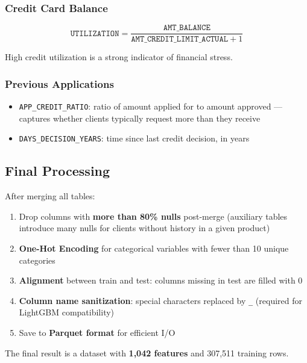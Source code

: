 \documentclass[12pt, a4paper]{article}
\begin{document}
\subsubsection{Credit Card Balance}

\begin{equation}
    \texttt{UTILIZATION} = \frac{\texttt{AMT\_BALANCE}}{\texttt{AMT\_CREDIT\_LIMIT\_ACTUAL} + 1}
\end{equation}

High credit utilization is a strong indicator of financial stress.

\subsubsection{Previous Applications}

\begin{itemize}
    \item \texttt{APP\_CREDIT\_RATIO}: ratio of amount applied for to amount approved
          --- captures whether clients typically request more than they receive
    \item \texttt{DAYS\_DECISION\_YEARS}: time since last credit decision, in years
\end{itemize}

\subsection{Final Processing}

After merging all tables:

\begin{enumerate}
    \item Drop columns with \textbf{more than 80\% nulls} post-merge (auxiliary tables
          introduce many nulls for clients without history in a given product)
    \item \textbf{One-Hot Encoding} for categorical variables with fewer than 10 unique
          categories
    \item \textbf{Alignment} between train and test: columns missing in test are
          filled with 0
    \item \textbf{Column name sanitization}: special characters replaced by \texttt{\_}
          (required for LightGBM compatibility)
    \item Save to \textbf{Parquet format} for efficient I/O
\end{enumerate}

The final result is a dataset with \textbf{1,042 features} and 307,511 training rows.
\end{document}

